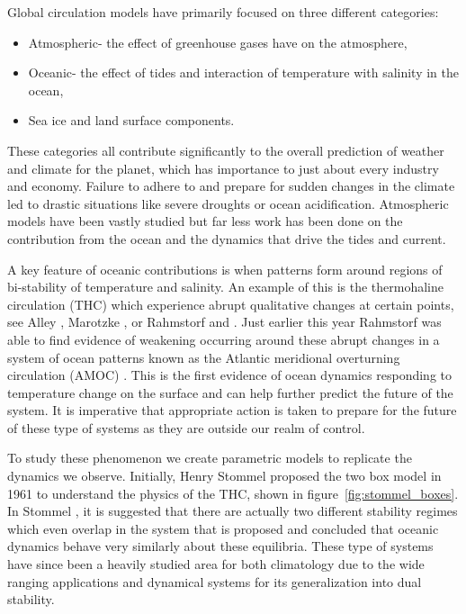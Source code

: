 Global circulation models have primarily focused on three different categories: 
\begin{itemize}
\item Atmospheric- the effect of greenhouse gases have on the atmosphere,
\item Oceanic- the effect of tides and interaction of temperature with salinity in the ocean,
\item Sea ice and land surface components.
\end{itemize}
These categories all contribute significantly to the overall prediction of weather and climate for the planet, which has importance to just about every industry and economy. Failure to adhere to and prepare for sudden changes in the climate led to drastic situations like severe droughts or ocean acidification. Atmospheric models have been vastly studied but far less work has been done on the contribution from the ocean and the dynamics that drive the tides and current.

A key feature of oceanic contributions is when patterns form around regions of bi-stability of temperature and salinity. An example of this is the thermohaline circulation (THC) which experience abrupt qualitative changes at certain points, see Alley \cite{alley2003abrupt},
Marotzke \cite{marotzke2000abrupt},
or Rahmstorf \cite{rahmstorf2000thermohaline} and
\cite{rahmstorf2002ocean}. Just earlier this year Rahmstorf was able to find evidence of weakening occurring around these abrupt changes in a system of ocean patterns known as the Atlantic meridional overturning circulation (AMOC) \cite{caesar2018AMOC}. This is the first evidence of ocean dynamics responding to temperature change on the surface and can help further predict the future of the system. It is imperative that appropriate action is taken to prepare for the future of these type of systems as they are outside our realm of control. 

To study these phenomenon we create parametric models to replicate the dynamics we observe. Initially, Henry Stommel proposed the two box model in 1961 to understand the physics of the THC, shown in figure~\ref{fig:stommel_boxes}. In Stommel \cite{stommel1961thermohaline}, it is suggested that there are actually two different stability regimes which even overlap in the system that is proposed and concluded that oceanic dynamics behave very similarly about these equilibria. These type of systems have since been a heavily studied area for both climatology due to the wide ranging applications and dynamical systems for its generalization into dual stability.


